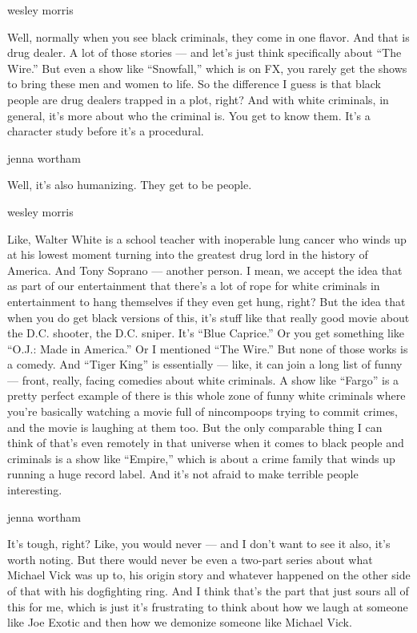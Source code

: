 wesley morris

Well, normally when you see black criminals, they come in one flavor.
And that is drug dealer. A lot of those stories --- and let's just think
specifically about ``The Wire.'' But even a show like ``Snowfall,''
which is on FX, you rarely get the shows to bring these men and women to
life. So the difference I guess is that black people are drug dealers
trapped in a plot, right? And with white criminals, in general, it's
more about who the criminal is. You get to know them. It's a character
study before it's a procedural.

jenna wortham

Well, it's also humanizing. They get to be people.

wesley morris

Like, Walter White is a school teacher with inoperable lung cancer who
winds up at his lowest moment turning into the greatest drug lord in the
history of America. And Tony Soprano --- another person. I mean, we
accept the idea that as part of our entertainment that there's a lot of
rope for white criminals in entertainment to hang themselves if they
even get hung, right? But the idea that when you do get black versions
of this, it's stuff like that really good movie about the D.C. shooter,
the D.C. sniper. It's ``Blue Caprice.'' Or you get something like
``O.J.: Made in America.'' Or I mentioned ``The Wire.'' But none of
those works is a comedy. And ``Tiger King'' is essentially --- like, it
can join a long list of funny --- front, really, facing comedies about
white criminals. A show like ``Fargo'' is a pretty perfect example of
there is this whole zone of funny white criminals where you're basically
watching a movie full of nincompoops trying to commit crimes, and the
movie is laughing at them too. But the only comparable thing I can think
of that's even remotely in that universe when it comes to black people
and criminals is a show like ``Empire,'' which is about a crime family
that winds up running a huge record label. And it's not afraid to make
terrible people interesting.

jenna wortham

It's tough, right? Like, you would never --- and I don't want to see it
also, it's worth noting. But there would never be even a two-part series
about what Michael Vick was up to, his origin story and whatever
happened on the other side of that with his dogfighting ring. And I
think that's the part that just sours all of this for me, which is just
it's frustrating to think about how we laugh at someone like Joe Exotic
and then how we demonize someone like Michael Vick.

